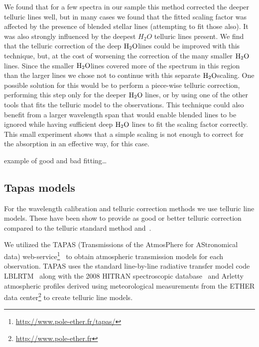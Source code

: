 We found that for a few spectra in our sample this method corrected the deeper telluric lines well, but in many cases we found that the fitted scaling factor was affected by the presence of blended stellar lines (attempting to fit those also). It was also strongly influenced by the deepest \(H_{2}O\) telluric lines present. We find that the telluric correction of the deep \(\rm H_{2}O\)lines could be improved with this technique, but, at the cost of worsening the correction of the many smaller \(\rm H_{2}O\)lines. Since the smaller \(\rm H_{2}O\)lines covered more of the spectrum in this region than the larger lines we chose not to continue with this separate \(\rm H_{2}O\)scaling. One possible solution for this would be to perform a piece-wise telluric correction, performing this step only for the deeper \(\rm H_{2}O\) lines, or by using one of the other tools that fits the telluric model to the observations. This technique could also benefit from a larger wavelength span that would enable blended lines to be ignored while having sufficient deep \(\rm H_{2}O\) lines to fit the scaling factor correctly. This small experiment shows that a simple scaling is not enough to correct for the absorption in an effective way, for this case.



 example of good and bad fitting\ldots


\subsection{Tapas models}
\label{subsec:tapas_models_usage}
For the wavelength calibration and telluric correction methods we use telluric line models. These have been show to provide as good or better telluric correction compared to the telluric standard method and~\citep{ulmer-moll_telluric_2018}.

We utilized the TAPAS (Transmissions of the AtmosPhere for AStronomical data) web-service\footnote{\url{http://www.pole-ether.fr/tapas/}}~\citep{bertaux_tapas_2014} to obtain atmospheric transmission models for each observation. TAPAS uses the standard line-by-line radiative transfer model code LBLRTM~\citep{clough_linebyline_1995} along with the 2008 HITRAN spectroscopic database~\citep{rothman_hitran_2009} and Arletty atmospheric profiles derived using meteorological measurements from the ETHER data center\footnote{\url{http://www.pole-ether.fr}} to create telluric line models.

